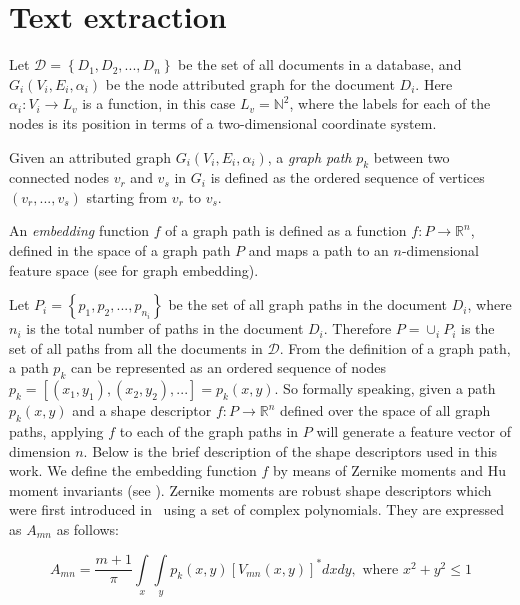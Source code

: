 \section{Text extraction}
\label{ssec:hssg:pthdesc}
Let $\mathcal{D}=\left\{D_1,D_2,...,D_n\right\}$ be the set of all documents in a database, and $G_i(V_i,E_i,\alpha_i)$ be the node attributed graph for the document $D_i$. Here $\alpha_i:V_i\rightarrow L_v$ is a function, in this case $L_v=\mathbb{N}^2$, where the labels for each of the nodes is its position in terms of a two-dimensional coordinate system.
\begin{definition}
Given an attributed graph $G_i(V_i,E_i,\alpha_i)$, a \emph{graph path} $p_k$ between two connected nodes $v_r$ and $v_s$ in $G_i$ is defined as the ordered sequence of vertices $(v_r,...,v_s)$ starting from $v_r$ to $v_s$.
\end{definition}
\begin{definition}
An \emph{embedding} function $f$ of a graph path is defined as a function $f:P\rightarrow\mathbb{R}^n$, defined in the space of a graph path $P$ and maps a path to an $n$-dimensional feature space (see  for graph embedding).
\end{definition}
Let $P_i=\left\{p_1,p_2,...,p_{n_i}\right\}$ be the set of all graph paths in the document $D_i$, where $n_i$ is the total number of paths in the document $D_i$. Therefore $P=\cup_{i} P_i$ is the set of all paths from all the documents in $\mathcal{D}$. From the definition of a graph path, a path $p_k$ can be represented as an ordered sequence of nodes \ie~$p_k=[(x_1,y_1),(x_2,y_2),...]=p_k(x,y)$. So formally speaking, given a path $p_k(x,y)$ and a shape descriptor $f:P\rightarrow\mathbb{R}^n$ defined over the space of all graph paths, applying $f$ to each of the graph paths in $P$ will generate a feature vector of dimension $n$. Below is the brief description of the shape descriptors used in this work. We define the embedding function $f$ by means of Zernike moments and Hu moment invariants (see ).
\label{sssec:hssg:zernike}
Zernike moments are robust shape descriptors which were first introduced in~\cite{Teague1980} using a set of complex polynomials. They are expressed as $A_{mn}$ as follows:

\begin{equation}
A_{mn}=\frac{m+1}{\pi}\int\limits_{x}\int\limits_{y} p_k(x,y)[V_{mn}(x,y)]^*dx dy, \mbox{ where } x^2+y^2\leq1
\label{eqn:hssg:zernike1}
\end{equation}

